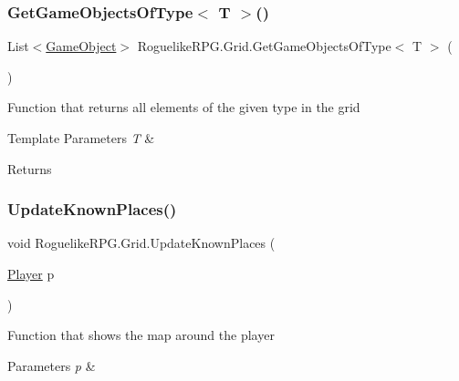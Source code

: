\subsubsection{\texorpdfstring{Get\+Game\+Objects\+Of\+Type$<$ T $>$()}{GetGameObjectsOfType< T >()}}
{\footnotesize\ttfamily List$<$\mbox{\hyperlink{class_roguelike_r_p_g_1_1_game_object}{Game\+Object}}$>$ Roguelike\+R\+P\+G.\+Grid.\+Get\+Game\+Objects\+Of\+Type$<$ T $>$ (\begin{DoxyParamCaption}{ }\end{DoxyParamCaption})\hspace{0.3cm}{\ttfamily [inline]}}



Function that returns all elements of the given type in the grid 


\begin{DoxyTemplParams}{Template Parameters}
{\em T} & \\
\hline
\end{DoxyTemplParams}
\begin{DoxyReturn}{Returns}

\end{DoxyReturn}
\mbox{\label{class_roguelike_r_p_g_1_1_grid_a025f9368d08af8faf4d3e25765f60aaa}} 
\subsubsection{\texorpdfstring{Update\+Known\+Places()}{UpdateKnownPlaces()}}
{\footnotesize\ttfamily void Roguelike\+R\+P\+G.\+Grid.\+Update\+Known\+Places (\begin{DoxyParamCaption}\item[{\mbox{\hyperlink{class_roguelike_r_p_g_1_1_player}{Player}}}]{p }\end{DoxyParamCaption})\hspace{0.3cm}{\ttfamily [inline]}}



Function that shows the map around the player 


\begin{DoxyParams}{Parameters}
{\em p} & \\
\hline
\end{DoxyParams}
\mbox{\label{class_roguelike_r_p_g_1_1_grid_a91be273f5c588230875e727f69956db9}} 

